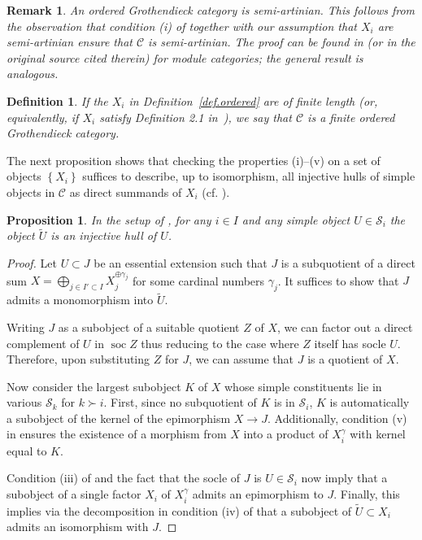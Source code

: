 \documentclass[11pt]{article}
\theoremstyle{plain}
\newtheorem{proposition}[lemma]{Proposition}
\theoremstyle{nonumberplain}
\theoremstyle{plain}
\newtheorem{definition}[lemma]{Definition}
\newtheorem{remark}[lemma]{Remark}
\theoremstyle{nonumberplain}
\newtheorem{proof}{Proof}
\newcommand\cC{\mathcal C}
\newcommand\cS{\mathcal S}
\DeclareMathOperator{\soc}{\mathrm{soc}}
\begin{document}
\begin{remark}\label{re.is-sa}
  An ordered Grothendieck category is semi-artinian.  This follows
  from the observation that condition (i) of 
  together with our assumption that $X_i$ are semi-artinian ensure
  that $\cC$ is semi-artinian.
  The proof can be found in \cite[41.10 (4)]{BW} (or in the original
  source \cite[27.5, 32.5]{W} cited therein) for module categories;
  the general result is analogous.
\end{remark}



\begin{definition}
  If the $X_i$ in Definition~\ref{def.ordered} are of finite length
  (or, equivalently, if $X_i$ satisfy Definition 2.1 in~\cite{us}), we
  say that $\mathcal{C}$ is a \emph{finite ordered Grothendieck
    category}.
\label{def.finordgroth}
\end{definition}



The next proposition shows that checking the properties (i)--(v) on a
set of objects $\left\{X_i\right\}$ suffices to describe, up to
isomorphism, all injective hulls of simple objects in $\mathcal{C}$ as
direct summands of $X_i$ (cf. \cite[Proposition 2.3]{us}).

\begin{proposition}\label{pr.inj-hull}
  In the setup of , for any $i\in I$ and any simple
  object $U\in \cS_i$ the object $\widetilde{U}$ is an injective hull
  of $U$.
\end{proposition}
\begin{proof}
  Let $U\subset J$ be an essential extension such that $J$ is a
  subquotient of a direct sum
  $X=\bigoplus\limits_{j\in I'\subset I} X_j^{\oplus {\gamma}_j}$ for
  some cardinal numbers ${\gamma}_j$. It suffices to show that $J$
  admits a monomorphism into $\widetilde{U}$.

  Writing $J$ as a subobject of a suitable quotient $Z$ of $X$, we can
  factor out a direct complement of $U$ in $\soc Z$ thus reducing to
  the case where $Z$ itself has socle $U$. Therefore, upon
  substituting $Z$ for $J$, we can assume that $J$ is a quotient of
  $X$.

  Now consider the largest subobject $K$ of $X$ whose simple
  constituents lie in various $\cS_k$ for $k{\succ} i$. First, since
  no subquotient of $K$ is in $\cS_i$, $K$ is automatically a
  subobject of the kernel of the epimorphism $X\to J$. Additionally,
  condition (v) in  ensures the existence of a
  morphism from $X$ into a product of $X_i^\gamma$ with kernel equal
  to $K$.

  Condition (iii) of  and the fact that the socle of
  $J$ is $U\in \cS_i$ now imply that a subobject of a single factor
  $X_i$ of $X_i^\gamma$ admits an epimorphism to $J$. Finally, this
  implies via the decomposition in condition (iv) of
   that a subobject of $\widetilde{U}\subset X_i$
  admits an isomorphism with $J$.
\end{proof}
\end{document}
